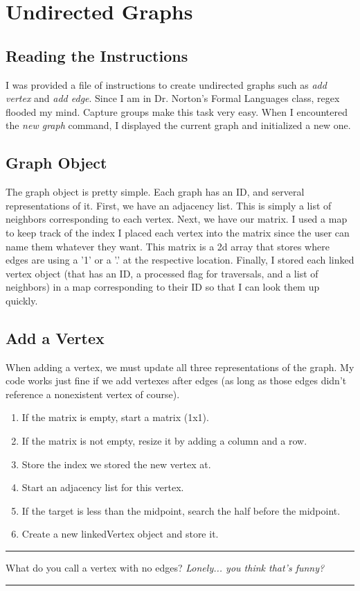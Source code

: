 \documentclass[letterpaper, 10pt]{article}
\begin{document}
\newpage

\section{Undirected Graphs}
\subsection{Reading the Instructions}
I was provided a file of instructions to create undirected graphs such as \textit{add vertex} and \textit{add edge}. Since I am in Dr. Norton's Formal Languages class, regex flooded my mind. Capture groups make this task very easy. When I encountered the \textit{new graph} command, I displayed the current graph and initialized a new one. 


\subsection{Graph Object}
The graph object is pretty simple. Each graph has an ID, and serveral representations of it. First, we have an adjacency list. This is simply a list of neighbors corresponding to each vertex. Next, we have our matrix. I used a map to keep track of the index I placed each vertex into the matrix since the user can name them whatever they want. This matrix is a 2d array that stores where edges are using a '1' or a '.' at the respective location. Finally, I stored each linked vertex object (that has an ID, a processed flag for traversals, and a list of neighbors) in a map corresponding to their ID so that I can look them up quickly. 



\subsection{Add a Vertex}
When adding a vertex, we must update all three representations of the graph. My code works just fine if we add vertexes after edges (as long as those edges didn't reference a nonexistent vertex of course). 
\begin{enumerate}
    \item If the matrix is empty, start a matrix (1x1).
    \item If the matrix is not empty, resize it by adding a column and a row.
    \item Store the index we stored the new vertex at.
    \item Start an adjacency list for this vertex.
    \item If the target is less than the midpoint, search the half before the midpoint.
    \item Create a new linkedVertex object and store it.
\end{enumerate}

\hrule
\vspace{.25cm}
What do you call a vertex with no edges? \textit{Lonely... you think that's funny?}\\
\hrule
\vspace{.5cm}
\end{document}
